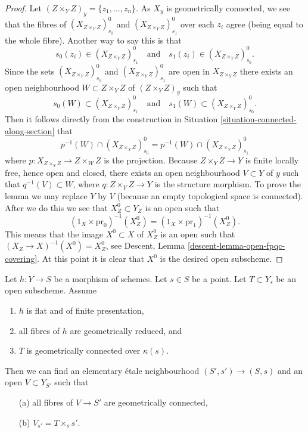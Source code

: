 \begin{proof}
\medskip\noindent
Let $(Z \times_Y Z)_y = \{z_1, \ldots, z_n\}$.
As $X_y$ is geometrically connected, we see that the fibres of
$(X_{Z \times_Y Z})_{s_0}^0$ and $(X_{Z \times_Y Z})_{s_1}^0$
over each $z_i$ agree (being equal to the whole fibre). Another
way to say this is that
$$
s_0(z_i) \in (X_{Z \times_Y Z})_{s_1}^0
\quad\text{and}\quad
s_1(z_i) \in (X_{Z \times_Y Z})_{s_0}^0.
$$
Since the sets $(X_{Z \times_Y Z})_{s_0}^0$ and $(X_{Z \times_Y Z})_{s_1}^0$
are open in $X_{Z \times_Y Z}$ there exists an open neighbourhood
$W \subset Z \times_Y Z$ of $(Z \times_Y Z)_y$ such that
$$
s_0(W) \subset (X_{Z \times_Y Z})_{s_1}^0
\quad\text{and}\quad
s_1(W) \subset (X_{Z \times_Y Z})_{s_0}^0.
$$
Then it follows directly from the construction in
Situation \ref{situation-connected-along-section}
that
$$
p^{-1}(W) \cap (X_{Z \times_Y Z})_{s_0}^0
=
p^{-1}(W) \cap (X_{Z \times_Y Z})_{s_1}^0
$$
where $p : X_{Z \times_Y Z} \to Z \times_W Z$ is the projection.
Because $Z \times_Y Z \to Y$ is finite locally free, hence open and closed,
there exists an open neighbourhood $V \subset Y$ of $y$ such that
$q^{-1}(V) \subset W$, where $q : Z \times_Y Z \to Y$ is the
structure morphism. To prove the lemma we may replace $Y$ by $V$
(because an empty topological space is connected). After we do this
we see that $X_Z^0 \subset Y_Z$ is an open such that
$$
(1_X \times \text{pr}_0)^{-1}(X_Z^0) =
(1_X \times \text{pr}_1)^{-1}(X_Z^0).
$$
This means that the image $X^0 \subset X$ of $X_Z^0$ is an open such
that $(X_Z \to X)^{-1}(X^0) = X_Z^0$, see
Descent, Lemma \ref{descent-lemma-open-fpqc-covering}.
At this point it is clear that $X^0$ is the desired open subscheme.
\end{proof}

\begin{lemma}
\label{lemma-fibre-geometrically-connected-reduced}
Let $h : Y \to S$ be a morphism of schemes.
Let $s \in S$ be a point.
Let $T \subset Y_s$ be an open subscheme.
Assume
\begin{enumerate}
\item $h$ is flat and of finite presentation,
\item all fibres of $h$ are geometrically reduced, and
\item $T$ is geometrically connected over $\kappa(s)$.
\end{enumerate}
Then we can find an elementary \'etale neighbourhood $(S', s') \to (S, s)$
and an open $V \subset Y_{S'}$ such that
\begin{enumerate}
\item[(a)] all fibres of $V \to S'$ are geometrically connected,
\item[(b)] $V_{s'} = T \times_s s'$.
\end{enumerate}
\end{lemma}


